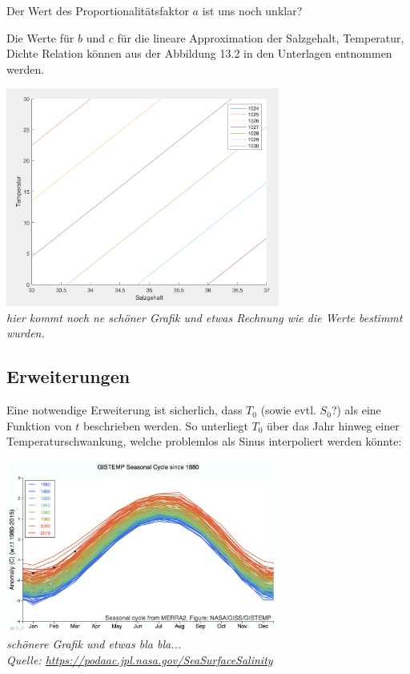 \documentclass[11pt,a4paper]{article}
\begin{document}
	Der Wert des Proportionalitätsfaktor \(a\) ist uns noch unklar?
	
	Die Werte für \(b\) und \(c\) für die lineare Approximation der Salzgehalt, Temperatur, Dichte Relation können aus der Abbildung 13.2 in den Unterlagen entnommen werden.
	
	\begin{center}
	\includegraphics[width=9cm]{Diagramme/salz_temp_dichte.png} \\
	\textit{hier kommt noch ne schöner Grafik und etwas Rechnung wie die Werte bestimmt wurden.}
	\end{center}	
	
	\subsection*{Erweiterungen}
	
	Eine notwendige Erweiterung ist sicherlich, dass \(T_0\) (sowie evtl. \(S_0\)?) als eine Funktion von \(t\) beschrieben werden. So unterliegt \(T_0\) über das Jahr hinweg einer Temperaturschwankung, welche problemlos als Sinus interpoliert werden könnte:
	
	\begin{center}
	\includegraphics[width=9cm]{Diagramme/GISTEMP.png} \\
	\textit{schönere Grafik und etwas bla bla...\\
	Quelle: \url{https://podaac.jpl.nasa.gov/SeaSurfaceSalinity}}
	\end{center}	
	
\end{document}
